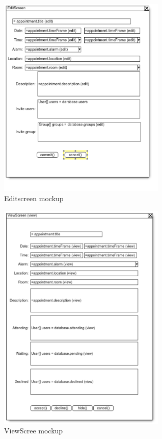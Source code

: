 \documentclass{article}
\begin{document}
\begin{figure}[h!] 
    \begin{center} 
        \includegraphics[width=8cm]{editscreendesign.png}
        \caption{Editscreen mockup}
    \label{editmockup}
    \end{center}
\end{figure}

\begin{figure}[h!] 
    \begin{center} 
        \includegraphics[width=8cm]{viewscreendesign.png}
        \caption{ViewScree mockup}
    \label{viewmockup}
    \end{center}
\end{figure}
\end{document}
